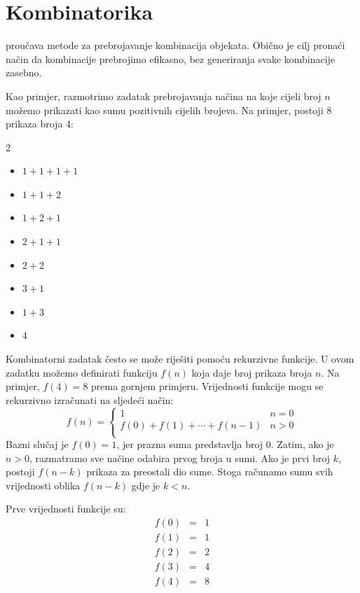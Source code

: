 \chapter{Kombinatorika}


 proučava metode za prebrojavanje
kombinacija objekata.
Obično je cilj pronaći način da
kombinacije prebrojimo efikasno,
bez generiranja svake kombinacije zasebno.

Kao primjer, razmotrimo zadatak
prebrojavanja načina na koje
cijeli broj $n$ možemo prikazati kao sumu pozitivnih cijelih brojeva.
Na primjer, postoji 8 prikaza
broja $4$:
\begin{multicols}{2}
\begin{itemize}
\item $1+1+1+1$
\item $1+1+2$
\item $1+2+1$
\item $2+1+1$
\item $2+2$
\item $3+1$
\item $1+3$
\item $4$
\end{itemize}
\end{multicols}

Kombinatorni zadatak često se može riješiti
pomoću rekurzivne funkcije.
U ovom zadatku možemo definirati funkciju $f(n)$
koja daje broj prikaza broja $n$.
Na primjer, $f(4)=8$ prema gornjem primjeru.
Vrijednosti funkcije
mogu se rekurzivno izračunati na sljedeći način:
\begin{equation*}
    f(n) = \begin{cases}
               1               & n = 0\\
               f(0)+f(1)+\cdots+f(n-1) & n > 0\\
           \end{cases}
\end{equation*}
Bazni slučaj je $f(0)=1$,
jer prazna suma predstavlja broj 0.
Zatim, ako je $n>0$, razmatramo sve načine
odabira prvog broja u sumi.
Ako je prvi broj $k$,
postoji $f(n-k)$ prikaza
za preostali dio sume.
Stoga računamo sumu svih vrijednosti
oblika $f(n-k)$ gdje je $k<n$.

Prve vrijednosti funkcije su:
\[
\begin{array}{lcl}
f(0) & = & 1 \\
f(1) & = & 1 \\
f(2) & = & 2 \\
f(3) & = & 4 \\
f(4) & = & 8 \\
\end{array}
\]

